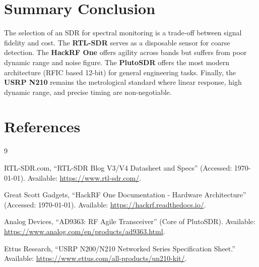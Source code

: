 \documentclass[11pt]{article}
\begin{document}
\section{Summary Conclusion}
The selection of an SDR for spectral monitoring is a trade-off between signal fidelity and cost. The \textbf{RTL-SDR} serves as a disposable sensor for coarse detection. The \textbf{HackRF One} offers agility across bands but suffers from poor dynamic range and noise figure. The \textbf{PlutoSDR} offers the most modern architecture (RFIC based 12-bit) for general engineering tasks. Finally, the \textbf{USRP N210} remains the metrological standard where linear response, high dynamic range, and precise timing are non-negotiable.

\section{References}
\begin{thebibliography}{9}

RTL-SDR.com, ``RTL-SDR Blog V3/V4 Datasheet and Specs'' (Accessed: \today). Available: \url{https://www.rtl-sdr.com/}.

Great Scott Gadgets, ``HackRF One Documentation - Hardware Architecture'' (Accessed: \today). Available: \url{https://hackrf.readthedocs.io/}.

Analog Devices, ``AD9363: RF Agile Transceiver'' (Core of PlutoSDR). Available: \url{https://www.analog.com/en/products/ad9363.html}.

Ettus Research, ``USRP N200/N210 Networked Series Specification Sheet.'' Available: \url{https://www.ettus.com/all-products/un210-kit/}.

\end{thebibliography}
\end{document}
